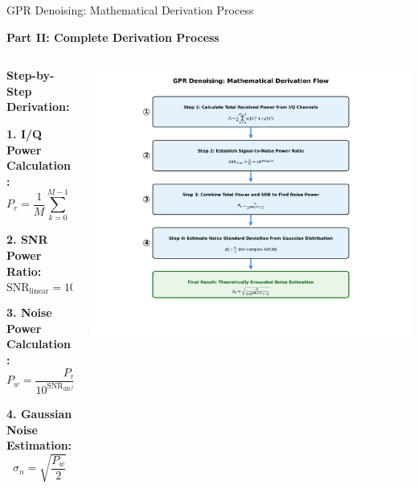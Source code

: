\documentclass[aspectratio=169]{beamer}
\begin{document}
\begin{frame}{GPR Denoising: Mathematical Derivation Process}
\begin{center}
\textcolor{zjutblue}{\Large \textbf{Part II: Complete Derivation Process}}
\end{center}

\vspace{0.1cm}
\begin{columns}
\begin{column}{0.45\textwidth}
\textbf{Step-by-Step Derivation:}

\vspace{0.1cm}
\textbf{1. I/Q Power Calculation:}
\begin{equation}
P_r = \frac{1}{M}\sum_{k=0}^{M-1}(r_I[k]^2 + r_Q[k]^2)
\end{equation}

\textbf{2. SNR Power Ratio:}
\begin{equation}
\text{SNR}_{\text{linear}} = 10^{\text{SNR}_{\text{dB}}/10}
\end{equation}

\textbf{3. Noise Power Calculation:}
\begin{equation}
P_w = \frac{P_r}{10^{\text{SNR}_{\text{dB}}/10} + 1}
\end{equation}

\textbf{4. Gaussian Noise Estimation:}
\begin{equation}
\sigma_n = \sqrt{\frac{P_w}{2}}
\end{equation}
\end{column}
\begin{column}{0.58\textwidth}
\vspace{-1.2cm}
\includegraphics[width=\textwidth]{figure/gpr_derivation_flow.png}
\end{column}
\end{columns}
\end{frame}
\end{document}
